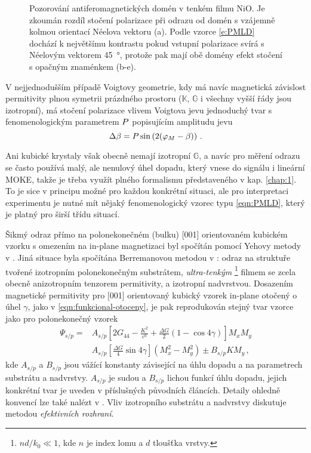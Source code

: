 \begin{figure}[htbp]
    \centering
    \caption{Pozorování antiferomagnetických domén v tenkém filmu NiO. Je zkoumán rozdíl stočení polarizace při odrazu od domén s vzájemně kolmou orientací Néelova vektoru (a). Podle vzorce \eqref{e:PMLD} dochází k největšímu kontrastu pokud vstupní polarizace svírá s Néelovým vektorem \SI{45}{\degree}, protože pak mají obě domény efekt stočení s opačným znaménkem (b-e).}
    \label{fig:AFM-mikroskopie-domen}
\end{figure}

V nejjednodušším případě Voigtovy geometrie, kdy má navíc magnetická závislost permitivity plnou symetrii prázdného prostoru ($\mathbb{K}$, $\mathbb{G}$ i všechny vyšší řády jsou izotropní), má stočení polarizace vlivem Voigtova jevu jednoduchý tvar s fenomenologickým parametrem $P$ popisujícím amplitudu jevu
\begin{equation} 
\label{eqn:PMLD}
    \Delta \beta=P \sin\left(2(\varphi_M-\beta)\right) \,.
\end{equation}

Ani kubické krystaly však obecně nemají izotropní $\mathbb{G}$, a navíc pro měření odrazu se často používá malý, ale nenulový úhel dopadu, který vnese do signálu i lineární MOKE, takže je třeba využít plného formalismu představeného v kap. \ref{chap:1}.
To je sice v principu možné pro každou konkrétní situaci, ale pro interpretaci experimentu je nutné mít nějaký fenomenologický vzorec typu \eqref{eqn:PMLD}, který je platný pro širší třídu situací.

Šikmý odraz přímo na polonekonečném (bulku) [001] orientovaném kubickém vzorku s omezením na in-plane magnetizaci byl spočítán pomocí Yehovy metody v .
Jiná situace byla spočítána Berremanovou metodou v : odraz na struktuře tvořené izotropním polonekonečným substrátem, \emph{ultra-tenkým}
\footnote{$nd/k_0 \ll 1$, kde $n$ je index lomu a $d$ tloušťka vrstvy.}
filmem se zcela obecně anizotropním tenzorem permitivity, a izotropní nadvrstvou.
Dosazením magnetické permitivity pro [001] orientovaný kubický vzorek in-plane otočený o úhel $\gamma$, jako v \eqref{eqn:funkcional-otoceny}, je pak reprodukován stejný tvar vzorce jako pro polonekonečný vzorek
\begin{align} 
\label{eqn:QMOKE-vzorec}
    \Psi_{s/p}=
    & A_{s/p} \left[ 2G_{44}-\frac{K^2}{\varepsilon^0}+\frac{\Delta G}{2}(1-\cos 4\gamma)  \right] M_x M_y\\
    & A_{s/p} \left[ \frac{\Delta G}{4}\sin 4\gamma  \right] \left(M_x^2-M_y^2\right) \pm B_{s/p} K M_y \,,
\end{align}
kde $A_{s/p}$ a $B_{s/p}$ jsou vážící konstanty závisející na úhlu dopadu a na parametrech substrátu a nadvrstvy. 
$A_{s/p}$ je sudou a $B_{s/p}$ lichou funkcí úhlu dopadu, jejich konkrétní tvar je uveden v příslušných původních článcích.
Detaily ohledně konvencí lze také nalézt v .
Vliv izotropního substrátu a nadvrstvy diskutuje  metodou \emph{efektivních rozhraní}. 


